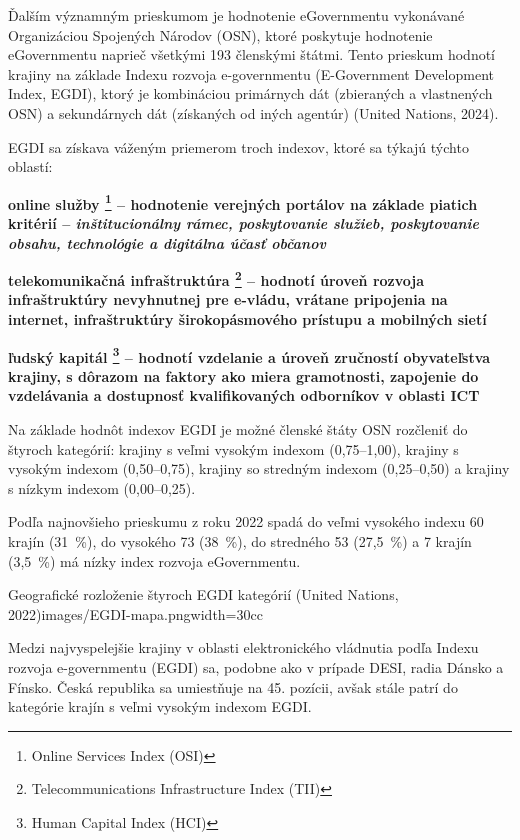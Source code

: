 Ďalším významným prieskumom je hodnotenie eGovernmentu vykonávané Organizáciou Spojených Národov (OSN), ktoré poskytuje hodnotenie eGovernmentu  naprieč všetkými 193 členskými štátmi. Tento prieskum hodnotí krajiny na základe Indexu rozvoja e-governmentu (E-Government Development Index, EGDI), ktorý je kombináciou primárnych dát (zbieraných a vlastnených OSN) a sekundárnych dát (získaných od iných agentúr) \scr(United Nations, 2024).

\blank
EGDI sa získava váženým priemerom troch indexov, ktoré sa týkajú týchto oblastí:

\startitemize
\item{\start\bf online služby \stop \footnote{Online Services Index (OSI)} -- hodnotenie verejných portálov na základe piatich kritérií -- \start\it inštitucionálny rámec, poskytovanie služieb, poskytovanie obsahu, technológie a digitálna účasť občanov\stop}
\item{\start\bf telekomunikačná infraštruktúra  \stop \footnote{Telecommunications Infrastructure Index (TII)} -- hodnotí úroveň rozvoja infraštruktúry nevyhnutnej pre e-vládu, vrátane pripojenia na internet, infraštruktúry širokopásmového prístupu a mobilných sietí}
\item{\start\bf ľudský kapitál \stop \footnote{Human Capital Index (HCI)} -- hodnotí vzdelanie a úroveň zručností obyvateľstva krajiny, s dôrazom na faktory ako miera gramotnosti, zapojenie do vzdelávania a dostupnosť kvalifikovaných odborníkov v oblasti ICT} %
\stopitemize 

Na základe hodnôt indexov EGDI je možné členské štáty OSN rozčleniť do štyroch kategórií: krajiny s veľmi vysokým indexom (0,75--1,00), krajiny s vysokým indexom (0,50--0,75), krajiny so stredným indexom (0,25--0,50) a krajiny s nízkym indexom (0,00--0,25).

Podľa najnovšieho prieskumu z roku 2022 spadá do veľmi vysokého indexu 60 krajín (31~\%), do vysokého 73 (38~\%), do stredného 53 (27,5~\%) a 7 krajín (3,5~\%) má nízky index rozvoja eGovernmentu.

{Geografické rozloženie štyroch EGDI kategórií (United Nations, 2022)}{images/EGDI-mapa.png}{width=30cc}

Medzi najvyspelejšie krajiny v oblasti elektronického vládnutia podľa Indexu rozvoja e-governmentu (EGDI) sa, podobne ako v prípade DESI, radia Dánsko a Fínsko. Česká republika sa umiestňuje na 45. pozícii, avšak stále patrí do kategórie krajín s veľmi vysokým indexom EGDI.

